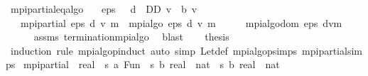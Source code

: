 \begin{isabellebody}
\isanewline
{}\isamarkupfalse%
\ mpi{\isacharunderscore}{\kern0pt}partial{\isacharunderscore}{\kern0pt}eq{\isacharunderscore}{\kern0pt}algo{\isacharcolon}{\kern0pt}\isanewline
\ \ \ {\isachardoublequoteopen}eps\ {\isachargreater}{\kern0pt}\ {}{\isachardoublequoteclose}\ {\isachardoublequoteopen}d\ {\isasymin}\ D\isactrlsub D{\isachardoublequoteclose}\ {\isachardoublequoteopen}v\ {\isasymle}\ {\isasymL}\isactrlsub b\ v{\isachardoublequoteclose}\isanewline
\ \ \ {\isachardoublequoteopen}mpi{\isacharunderscore}{\kern0pt}partial\ eps\ d\ v\ m\ {\isacharequal}{\kern0pt}\ mpi{\isacharunderscore}{\kern0pt}algo\ eps\ d\ v\ m{\isachardoublequoteclose}\isanewline
%
\isadelimproof
%
\endisadelimproof
%
\isatagproof
{}\isamarkupfalse%
\ {\isacharminus}{\kern0pt}\isanewline
\ \ \isamarkupfalse%
\ {\isachardoublequoteopen}mpi{\isacharunderscore}{\kern0pt}algo{\isacharunderscore}{\kern0pt}dom\ eps\ {\isacharparenleft}{\kern0pt}d{\isacharcomma}{\kern0pt}v{\isacharcomma}{\kern0pt}m{\isacharparenright}{\kern0pt}{\isachardoublequoteclose}\isanewline
\ \ \ \ \isamarkupfalse%
\ assms\ termination{\isacharunderscore}{\kern0pt}mpi{\isacharunderscore}{\kern0pt}algo\ \isamarkupfalse%
\ blast\isanewline
\ \ \isamarkupfalse%
\ {\isacharquery}{\kern0pt}thesis\isanewline
\ \ \ \ \isamarkupfalse%
\ {\isacharparenleft}{\kern0pt}induction\ rule{\isacharcolon}{\kern0pt}\ mpi{\isacharunderscore}{\kern0pt}algo{\isachardot}{\kern0pt}pinduct{\isacharparenright}{\kern0pt}\ {\isacharparenleft}{\kern0pt}auto\ simp{\isacharcolon}{\kern0pt}\ Let{\isacharunderscore}{\kern0pt}def\ mpi{\isacharunderscore}{\kern0pt}algo{\isachardot}{\kern0pt}psimps\ mpi{\isacharunderscore}{\kern0pt}partial{\isachardot}{\kern0pt}simps{\isacharparenright}{\kern0pt}\isanewline
{}\isamarkupfalse%
%
\endisatagproof
{\isafoldproof}%
%
\isadelimproof
\isanewline
%
\endisadelimproof
\isanewline
{}\isamarkupfalse%
\ mpi{\isacharunderscore}{\kern0pt}partial{\isacharprime}{\kern0pt}\ {\isacharcolon}{\kern0pt}{\isacharcolon}{\kern0pt}\ {\isachardoublequoteopen}real\ {\isasymRightarrow}\ {\isacharparenleft}{\kern0pt}{\isacharprime}{\kern0pt}s{\isacharcomma}{\kern0pt}\ {\isacharprime}{\kern0pt}a{\isacharparenright}{\kern0pt}\ Fun\ {\isasymRightarrow}\ {\isacharparenleft}{\kern0pt}{\isacharprime}{\kern0pt}s\ {\isasymRightarrow}\isactrlsub b\ real{\isacharparenright}{\kern0pt}\ {\isasymRightarrow}\ {\isacharparenleft}{\kern0pt}nat\ {\isasymRightarrow}\ {\isacharparenleft}{\kern0pt}{\isacharprime}{\kern0pt}s\ {\isasymRightarrow}\isactrlsub b\ real{\isacharparenright}{\kern0pt}\ {\isasymRightarrow}\ nat{\isacharparenright}{\kern0pt}\isanewline

\end{isabellebody}
